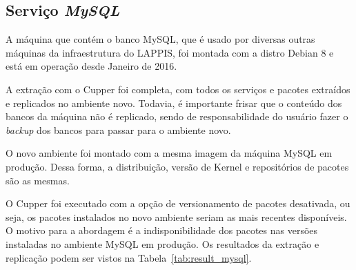 \subsection{Serviço \textit{MySQL}}

A máquina que contém o banco MySQL, que é usado por diversas outras máquinas da
infraestrutura do LAPPIS, foi montada com a distro Debian 8 e está em operação 
desde Janeiro de 2016.

A extração com o Cupper foi completa, com todos os serviços e pacotes extraídos
e replicados no ambiente novo. Todavia, é importante frisar que o conteúdo dos bancos
da máquina não é replicado, sendo de responsabilidade do usuário fazer o \textit{backup}
dos bancos para passar para o ambiente novo.

O novo ambiente foi montado com a mesma imagem da máquina MySQL em produção.
Dessa forma, a distribuição, versão de Kernel e repositórios de pacotes são as
mesmas.

O Cupper foi executado com a opção de versionamento de pacotes desativada, ou seja,
os pacotes instalados no novo ambiente seriam as mais recentes disponíveis. 
O motivo para a abordagem é a indisponibilidade dos pacotes nas versões 
instaladas no ambiente MySQL em produção. Os resultados da extração e replicação
podem ser vistos na Tabela~\ref{tab:result_mysql}.


